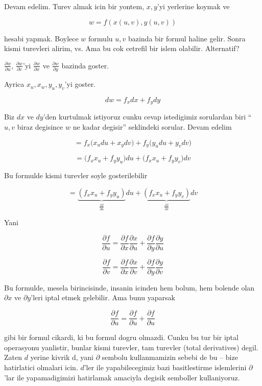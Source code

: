 \documentclass[12pt,fleqn]{article}
\begin{document}
Devam edelim. Turev almak icin bir yontem, $x,y$'yi yerlerine koymak ve

\[ w = f(x(u,v),y(u,v)) \]

hesabi yapmak. Boylece $w$ formulu $u,v$ bazinda bir formul haline
gelir. Sonra kismi turevleri alirim, vs. Ama bu cok cetrefil bir islem
olabilir. Alternatif?

$\frac{\partial w}{\partial u}$, $\frac{\partial w}{\partial v}$'yi $\frac{\partial w}{\partial x}$ ve $\frac{\partial w}{\partial y}$ bazinda goster. 

Ayrica $x_u, x_w, y_u, y_v$'yi goster. 

\[ dw =  f_xdx + f_y dy\]

Biz $dx$ ve $dy$'den kurtulmak istiyoruz cunku cevap istedigimiz sorulardan
biri ``$u,v$ biraz degisince $w$ ne kadar degisir'' seklindeki
sorular. Devam edelim

\[ = f_x \bigg( x_u du + x_y dv \bigg) + 
f_y \bigg( y_u du + y_v dv \bigg) \]

\[ = \bigg(f_x x_u + f_yy_u \bigg)du  + 
\bigg(f_xx_u + f_yy_v \bigg) dv \]

Bu formulde kismi turevler soyle gosterilebilir

\[ = \underbrace{(f_x x_u + f_yy_u )}_{\frac{\partial f}{\partial u}}du  + 
\underbrace{(f_xx_u + f_yy_v)}_{\frac{\partial f}{\partial v}}dv
\]

Yani

\[ \frac{\partial f}{\partial u} = 
\frac{\partial f}{\partial x}\frac{\partial x}{\partial u} +
\frac{\partial f}{\partial y}\frac{\partial y}{\partial u} 
\]

\[ \frac{\partial f}{\partial v} = 
\frac{\partial f}{\partial x}\frac{\partial x}{\partial v} +
\frac{\partial f}{\partial y}\frac{\partial y}{\partial v} 
\]

Bu formulde, mesela birincisinde, insanin icinden hem bolum, hem bolende
olan $\partial x$ ve $\partial y$'leri iptal etmek gelebilir. Ama bunu yaparsak

\[ \frac{\partial f}{\partial u} = 
\frac{\partial f}{\partial u} + \frac{\partial f}{\partial u} 
\]

gibi bir formul cikardi, ki bu formul dogru olmazdi. Cunku bu tur bir iptal
operasyonu yanlistir, bunlar kismi turevler, tam turevler (total
derivatives) degil. Zaten $d$ yerine kivrik d, yani $\partial$ sembolu
kullanmamizin sebebi de bu -- bize hatirlatici olmalari icin. $d$'ler ile
yapabilecegimiz bazi basitlestirme islemlerini $\partial$'lar ile
yapamadigimizi hatirlamak amaciyla degisik semboller kullaniyoruz. 
\end{document}
